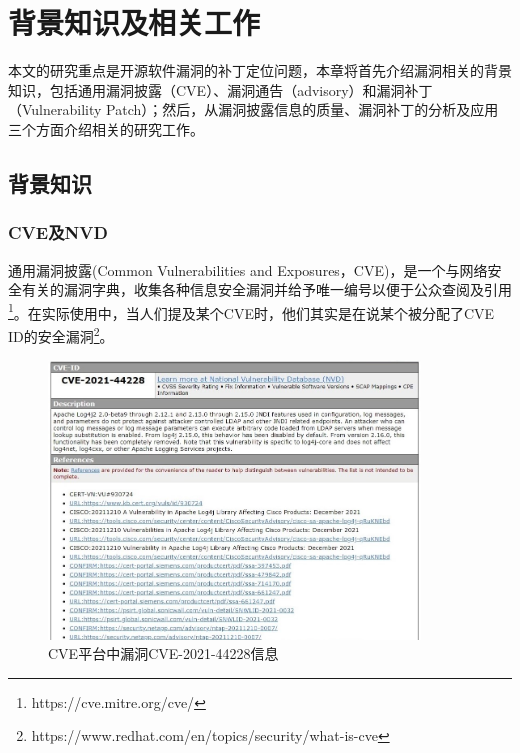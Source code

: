 \chapter{背景知识及相关工作}
本文的研究重点是开源软件漏洞的补丁定位问题，本章将首先介绍漏洞相关的背景知识，包括通用漏洞披露（CVE）、漏洞通告（advisory）和漏洞补丁（Vulnerability Patch）；然后，从漏洞披露信息的质量、漏洞补丁的分析及应用三个方面介绍相关的研究工作。


\section{背景知识}

\subsection{CVE及NVD} 
通用漏洞披露(Common Vulnerabilities and Exposures，CVE)\cite{mitre2021:cve}，是一个与网络安全有关的漏洞字典，收集各种信息安全漏洞并给予唯一编号以便于公众查阅及引用\footnote{https://cve.mitre.org/cve/}。在实际使用中，当人们提及某个CVE时，他们其实是在说某个被分配了CVE ID的安全漏洞\footnote{https://www.redhat.com/en/topics/security/what-is-cve}。
\begin{figure}[h]
    \centering
    \includegraphics[width=0.88\textwidth]{fig/CVE-2021-44228-2}
    \caption{CVE平台中漏洞CVE-2021-44228信息}
    \label{fig:CVE-2021-44228}
\end{figure}

